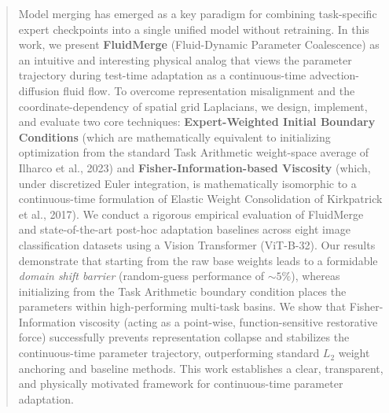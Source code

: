 \begin{abstract}
  Model merging has emerged as a key paradigm for combining task-specific expert checkpoints into a single unified model without retraining. In this work, we present \textbf{FluidMerge} (Fluid-Dynamic Parameter Coalescence) as an intuitive and interesting physical analog that views the parameter trajectory during test-time adaptation as a continuous-time advection-diffusion fluid flow. To overcome representation misalignment and the coordinate-dependency of spatial grid Laplacians, we design, implement, and evaluate two core techniques: \textbf{Expert-Weighted Initial Boundary Conditions} (which are mathematically equivalent to initializing optimization from the standard Task Arithmetic weight-space average of Ilharco et al., 2023) and \textbf{Fisher-Information-based Viscosity} (which, under discretized Euler integration, is mathematically isomorphic to a continuous-time formulation of Elastic Weight Consolidation of Kirkpatrick et al., 2017). We conduct a rigorous empirical evaluation of FluidMerge and state-of-the-art post-hoc adaptation baselines across eight image classification datasets using a Vision Transformer (ViT-B-32). Our results demonstrate that starting from the raw base weights leads to a formidable \emph{domain shift barrier} (random-guess performance of $\sim 5\%$), whereas initializing from the Task Arithmetic boundary condition places the parameters within high-performing multi-task basins. We show that Fisher-Information viscosity (acting as a point-wise, function-sensitive restorative force) successfully prevents representation collapse and stabilizes the continuous-time parameter trajectory, outperforming standard $L_2$ weight anchoring and baseline methods. This work establishes a clear, transparent, and physically motivated framework for continuous-time parameter adaptation.
\end{abstract}
